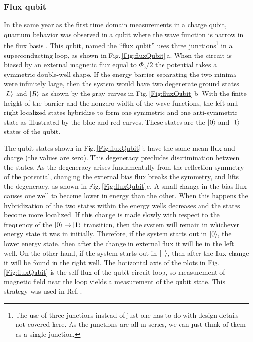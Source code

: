 \subsubsection{Flux qubit}

In the same year as the first time domain measurements in a charge qubit, quantum behavior was observed in a qubit where the wave function is narrow in the flux basis \cite{Mooij:fluxQubit1999, VanderWal:persistentCurrent2000}.
This qubit, named the ``flux qubit'' uses three junctions\footnote{The use of three junctions instead of just one has to do with design details not covered here. As the junctions are all in series, we can just think of them as a single junction.} in a superconducting loop, as shown in Fig.\,\ref{Fig:fluxQubit}\,a.
When the circuit is biased by an external magnetic flux equal to $\Phi_0 / 2$ the potential takes a symmetric double-well shape.
If the energy barrier separating the two minima were infinitely large, then the system would have two degenerate ground states $|L\rangle$ and $|R\rangle$ as shown by the gray curves in Fig.\,\ref{Fig:fluxQubit}\,b.
With the finite height of the barrier and the nonzero width of the wave functions, the left and right localized states hybridize to form one symmetric and one anti-symmetric state as illustrated by the blue and red curves.
These states are the $|0\rangle$ and $|1\rangle$ states of the qubit.

The qubit states shown in Fig.\,\ref{Fig:fluxQubit}\,b have the same mean flux and charge (the values are zero).
This degeneracy precludes discrimination between the states.
As the degeneracy arises fundamentally from the reflection symmetry of the potential, changing the external bias flux breaks the symmetry, and lifts the degeneracy, as shown in Fig.\,\ref{Fig:fluxQubit}\,c.
A small change in the bias flux causes one well to become lower in energy than the other.
When this happens the hybridization of the two states within the energy wells decreases and the states become more localized.
If this change is made slowly with respect to the frequency of the $|0\rangle \rightarrow |1\rangle$ transition, then the system will remain in whichever energy state it was in initially.
Therefore, if the system starts out in $|0\rangle$, the lower energy state, then after the change in external flux it will be in the left well.
On the other hand, if the system starts out in $|1\rangle$, then after the flux change it will be found in the right well.
The horizontal axis of the plots in Fig.\,\ref{Fig:fluxQubit} is the self flux of the qubit circuit loop, so measurement of magnetic field near the loop yields a measurement of the qubit state.
This strategy was used in Ref.\,\cite{VanderWal:persistentCurrent2000}.

